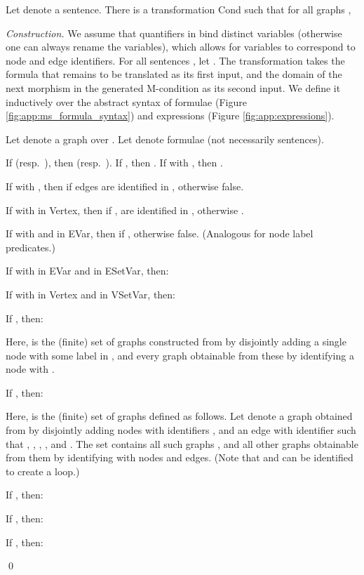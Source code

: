 \documentclass{llncs}
\begin{document}
	\begin{theorem}\label{thm:Cond}\rm
		Let  denote a sentence. There is a transformation Cond such that for all graphs ,

	

	\noindent \emph{Construction.} We assume that quantifiers in  bind distinct variables (otherwise one can always rename the variables), which allows for variables to correspond to node and edge identifiers. For all sentences , let . The transformation  takes the formula that remains to be translated as its first input, and the domain of the next morphism in the generated M-condition as its second input. We define it inductively over the abstract syntax of formulae (Figure \ref{fig:app:ms_formula_syntax}) and expressions (Figure \ref{fig:app:expressions}).

	Let  denote a graph over . Let  denote formulae (not necessarily sentences).

	If  (resp.\ ), then  (resp.\ ). If , then . If  with , then .
	
	If  with , then  if edges  are identified in , otherwise false.

	If  with  in Vertex, then  if ,  are identified in , otherwise .
	
	If  with  and  in EVar, then  if , otherwise false. (Analogous for node label predicates.)

	If  with  in EVar and  in ESetVar, then:
	
		
	If  with  in Vertex and  in VSetVar, then:
		

	If , then:

	

	\noindent Here,  is the (finite) set of graphs constructed from  by disjointly adding a single node  with some label in , and every graph obtainable from these by identifying a node with .

	If , then:

	

	\noindent Here,  is the (finite) set of graphs defined as follows. Let  denote a graph obtained from  by disjointly adding nodes with identifiers ,  and an edge with identifier  such that , , , , and . The set  contains all such graphs , and all other graphs obtainable from them by identifying  with nodes and edges. (Note that  and  can be identified to create a loop.)
	
	If , then:
	
	
	
	If , then:
	
	

	If , then:
	
	\qed
	\end{theorem}
	
\end{document}
